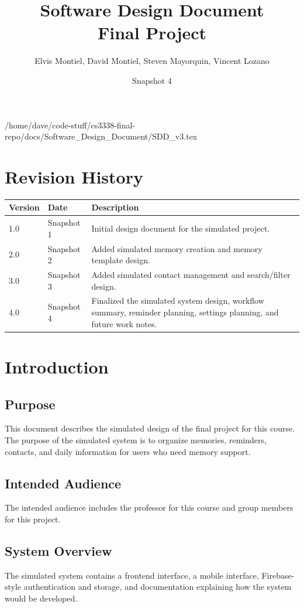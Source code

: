 /home/dave/code-stuff/cs3338-final-repo/docs/Software_Design_Document/SDD_v3.tex\documentclass{article}
\title{Software Design Document\\Final Project}
\author{Elvis Montiel, David Montiel, Steven Mayorquin, Vincent Lozano}
\date{Snapshot 4}
\begin{document}
\maketitle
\tableofcontents
\newpage

\section{Revision History}
\begin{longtable}{|p{2cm}|p{3cm}|p{8cm}|}
\hline
Version & Date & Description \\ \hline
1.0 & Snapshot 1 & Initial design document for the simulated project. \\ \hline
2.0 & Snapshot 2 & Added simulated memory creation and memory template design. \\ \hline
3.0 & Snapshot 3 & Added simulated contact management and search/filter design. \\ \hline
4.0 & Snapshot 4 & Finalized the simulated system design, workflow summary, reminder planning, settings planning, and future work notes. \\ \hline
\end{longtable}

\section{Introduction}
\subsection{Purpose}
This document describes the simulated design of the final project for this course. The purpose of the simulated system is to organize memories, reminders, contacts, and daily information for users who need memory support.

\subsection{Intended Audience}
The intended audience includes the professor for this course and group members for this project.

\subsection{System Overview}
The simulated system contains a frontend interface, a mobile interface, Firebase-style authentication and storage, and documentation explaining how the system would be developed.
\end{document}
